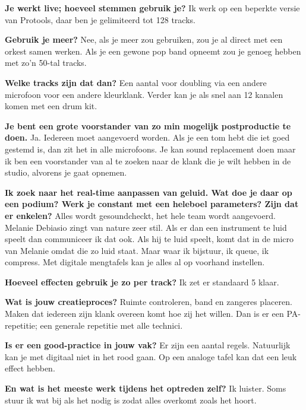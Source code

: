 \textbf{Je werkt live; hoeveel stemmen gebruik je?}\newline
Ik werk op een beperkte versie van Protools, daar ben je gelimiteerd tot 128 tracks.

\textbf{Gebruik je meer?}\newline
Nee, als je meer zou gebruiken, zou je al direct met een orkest samen werken. Als je een gewone pop band opneemt zou je genoeg hebben met zo'n 50-tal tracks.

\textbf{Welke tracks zijn dat dan?}\newline
Een aantal voor doubling via een andere microfoon voor een andere kleurklank. Verder kan je als snel aan 12 kanalen komen met een drum kit.

\textbf{Je bent een grote voorstander van zo min mogelijk postproductie te doen.}\newline
Ja. Iedereen moet aangevoerd worden. Als je een tom hebt die iet goed gestemd is, dan zit het in alle microfoons. Je kan sound replacement doen maar ik ben een voorstander van al te zoeken naar de klank die je wilt hebben in de studio, alvorens je gaat opnemen.

\textbf{Ik zoek naar het real-time aanpassen van geluid. Wat doe je daar op een podium? Werk je constant met een heleboel parameters? Zijn dat er enkelen?}\newline
Alles wordt gesoundcheckt, het hele team wordt aangevoerd. Melanie Debiasio zingt van nature zeer stil. Als er dan een instrument te luid speelt dan communiceer ik dat ook. Als hij te luid speelt, komt dat in de micro van Melanie omdat die zo luid staat.
Maar waar ik bijstuur, ik queue, ik compress.
Met digitale mengtafels kan je alles al op voorhand instellen.

\textbf{Hoeveel effecten gebruik je zo per track?}\newline
Ik zet er standaard 5 klaar.

\textbf{Wat is jouw creatieproces?}\newline
Ruimte controleren, band en zangeres placeren. Maken dat iedereen zijn klank overeen komt hoe zij het willen. Dan is er een PA-repetitie; een generale repetitie met alle technici.

\textbf{Is er een good-practice in jouw vak?}\newline
Er zijn een aantal regels. Natuurlijk kan je met digitaal niet in het rood gaan. Op een analoge tafel kan dat een leuk effect hebben.

\textbf{En wat is het meeste werk tijdens het optreden zelf?}\newline
Ik luister. Soms stuur ik wat bij als het nodig is zodat alles overkomt zoals het hoort.

